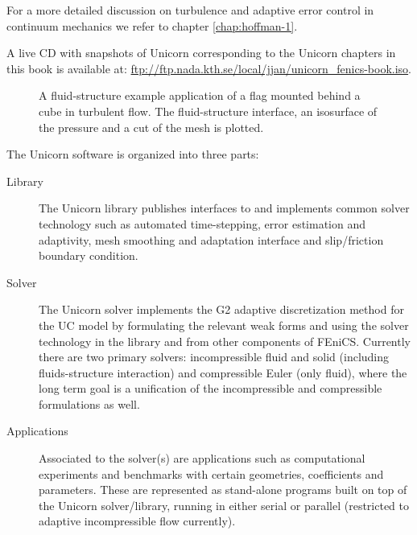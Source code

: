 For a more detailed discussion on turbulence and adaptive error
control in continuum mechanics we refer to
chapter \ref{chap:hoffman-1}.

A live CD with snapshots of Unicorn corresponding to the Unicorn
chapters in this book is available
at: \url{ftp://ftp.nada.kth.se/local/jjan/unicorn_fenics-book.iso}.

\begin{figure}[!h]
\caption{
A fluid-structure example application of a flag mounted behind a cube in turbulent flow. The fluid-structure interface, an isosurface of the pressure and a cut of the mesh is plotted.
}
\label{fig:flag3D}
\end{figure}

The Unicorn software is organized into three parts:
\begin{description}
\item[Library]
The Unicorn library publishes interfaces to and implements common
solver technology such as automated time-stepping, error
estimation and adaptivity, mesh smoothing and adaptation interface and
slip/friction boundary condition.
\item[Solver]
The Unicorn solver implements the G2 adaptive discretization method
for the UC model by formulating the relevant weak forms and using the
solver technology in the library and from other components of
FEniCS. Currently there are two primary solvers: incompressible
fluid and solid (including fluids-structure interaction) and compressible
Euler (only fluid), where the long term goal is a unification of the
incompressible and compressible formulations as well.
\item[Applications]
Associated to the solver(s) are applications such as computational
experiments and benchmarks with certain geometries, coefficients and
parameters. These are represented as stand-alone programs built on top
of the Unicorn solver/library, running in either serial or parallel
(restricted to adaptive incompressible flow currently).
\end{description}

